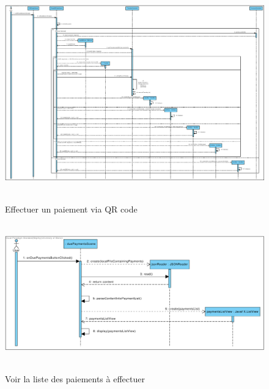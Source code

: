 \documentclass[]{report}
\begin{document}


\newpage

\begin{figure}[h!]
\hbox{
    \centering\includegraphics[width=\linewidth]{img/Sequence 2 - Extension 6.pdf}
}
\caption{Effectuer un paiement via QR code}
\end{figure}



\newpage

\begin{figure}[h!]
\hbox{
    \centering\includegraphics[width=\linewidth]{img/Sequence 3 - Extension 6.pdf}
}
\caption{Voir la liste des paiements à effectuer}
\end{figure}



\newpage
\end{document}
